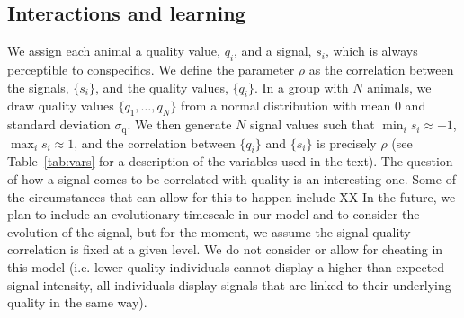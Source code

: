 \subsection{Interactions and learning }
We assign each animal a quality value, $q_i$, and a signal, $s_i$, which is always perceptible to conspecifics. We define the parameter $\rho$ as the correlation between the signals, $\{s_i\}$, and the quality values, $\{q_i\}$. In a group with $N$ animals, we draw quality values $\{q_1,\dots,q_N\}$ from a normal distribution with mean $0$ and standard deviation $\sigma_\text{q}$. We then generate $N$ signal values such that $\min_i{s_i}\approx -1$, $\max_i{s_i}\approx 1$, and the correlation between $\{q_i\}$ and $\{s_i\}$ is precisely $\rho$ (see Table~\ref{tab:vars} for a description of the variables used in the text). The question of how a signal comes to be correlated with quality is an interesting one. Some of the circumstances that can allow for this to happen include XX In the future, we plan to include an evolutionary timescale in our model and to consider the evolution of the signal, but for the moment, we assume the signal-quality correlation is fixed at a given level.
We do not consider or allow for cheating in this model (i.e. lower-quality individuals cannot display a higher than expected signal intensity, all individuals display signals that are linked to their underlying quality in the same way).
  
